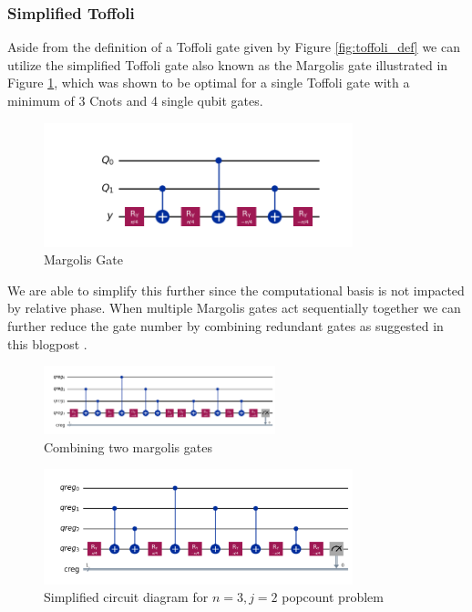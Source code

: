 \documentclass[12pt,a4paper]{article}
\begin{document}
\subsubsection{Simplified Toffoli}
Aside from the definition of a Toffoli gate given by Figure \ref{fig:toffoli_def} we can utilize the simplified Toffoli gate also known as the Margolis gate \cite{barenco_elementary_1995} illustrated in Figure \ref{fig:rccx},  which was shown to be optimal for a single Toffoli gate \cite{song2003simplifiedtoffoligateimplementation} with a minimum of 3 Cnots and 4 single qubit gates.
\begin{figure}[H] 
    \centering \includegraphics[width=0.8\textwidth]{Figures/rccx.png} 
    \caption{Margolis Gate} 
    \label{fig:rccx} 
\end{figure}
We are able to simplify this further since the computational basis is not impacted by relative phase. 
When multiple Margolis gates act sequentially together we can further reduce the gate number by combining redundant gates as suggested in this blogpost \cite{patrick_downing_qiskit_2021}.\begin{figure}[H] 
    \centering \includegraphics[width=0.6\textwidth]{Figures/intermediate_margolis.png} 
    \caption{Combining two margolis gates} 
    \label{fig:2margolis} 
\end{figure}
\begin{figure}[H] 
    \centering \includegraphics[width=0.8\textwidth]{Figures/n3j2_margolis_compact.png} 
    \caption{Simplified circuit diagram for \(n=3, j=2\) popcount problem} 
    \label{fig:simplified_margolis} 
\end{figure}
\end{document}
